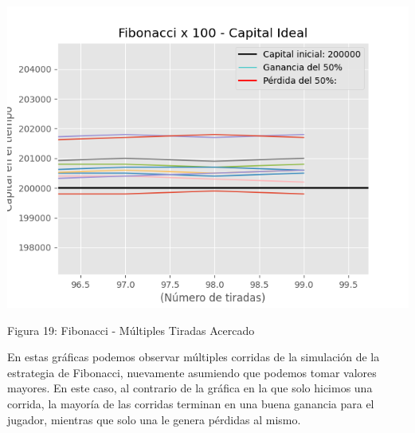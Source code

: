 \documentclass{article}
\begin{document}
\begin{center}
    \includegraphics[width=0.7\linewidth]{FIBx100-ideal-multiplestiradas(2).png}
    
    \caption{Figura 19: Fibonacci - Múltiples Tiradas Acercado}
\end{center}

En estas gráficas podemos observar múltiples corridas de la simulación de la estrategia de Fibonacci, nuevamente asumiendo que podemos tomar valores mayores. En este caso, al contrario de la gráfica en la que solo hicimos una corrida, la mayoría de las corridas terminan en una buena ganancia para el jugador, mientras que solo una le genera pérdidas al mismo.
\end{document}

